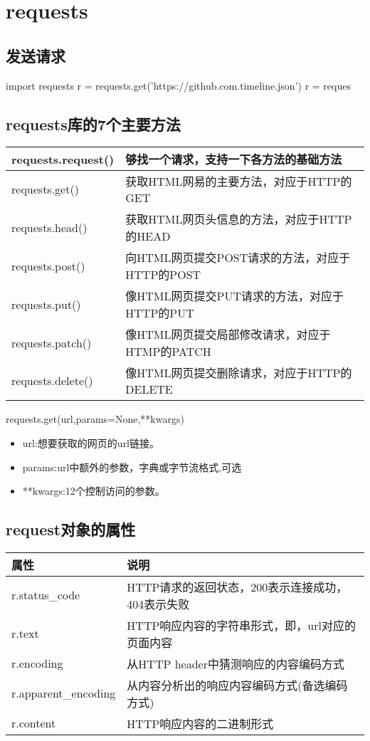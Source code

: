 \section{requests}
\subsection{发送请求}
\begin{python}
import requests
r = requests.get('https://github.com.timeline.json')
r = reques
\end{python}
\subsection{requests库的7个主要方法}
\begin{center}
\begin{tabular}{|p{3cm}|p{12cm}|}
\hline
requests.request()&够找一个请求，支持一下各方法的基础方法\\
\hline
requests.get()&获取HTML网易的主要方法，对应于HTTP的GET\\
\hline
requests.head()&获取HTML网页头信息的方法，对应于HTTP的HEAD\\
\hline
requests.post()&向HTML网页提交POST请求的方法，对应于HTTP的POST\\
\hline
requests.put()&像HTML网页提交PUT请求的方法，对应于HTTP的PUT\\
\hline
requests.patch()&像HTML网页提交局部修改请求，对应于HTMP的PATCH\\
\hline
requests.delete()&像HTML网页提交删除请求，对应于HTTP的DELETE\\
\hline
\end{tabular}
\end{center}
requests.get(url,params=None,**kwargs)
\begin{itemize}
\item url:想要获取的网页的url链接。
\item params:url中额外的参数，字典或字节流格式,可选
\item **kwargs:12个控制访问的参数。
\end{itemize}
\subsection{request对象的属性}
\begin{center}
\begin{tabular}{|p{3.5cm}|p{12cm}|}
\hline
属性&说明\\
\hline
r.status\_code&HTTP请求的返回状态，200表示连接成功，404表示失败\\
\hline
r.text&HTTP响应内容的字符串形式，即，url对应的页面内容\\
\hline
r.encoding&从HTTP header中猜测响应的内容编码方式\\
\hline
r.apparent\_encoding&从内容分析出的响应内容编码方式(备选编码方式)\\
\hline
r.content&HTTP响应内容的二进制形式\\
\hline
\end{tabular}
\end{center}
